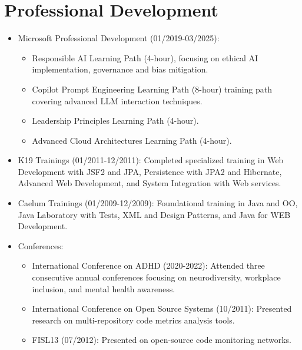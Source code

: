 
\section{Professional Development}
\begin{itemize}
    \item \footnotesize{Microsoft Professional Development (01/2019-03/2025):}
    \begin{itemize}
        \item \scriptsize{Responsible AI Learning Path (4-hour), focusing on ethical AI implementation, governance and bias mitigation.}
        \item \scriptsize{Copilot Prompt Engineering Learning Path (8-hour) training path covering advanced LLM interaction techniques.}
        \item \scriptsize{Leadership Principles Learning Path (4-hour).}
        \item \scriptsize{Advanced Cloud Architectures Learning Path (4-hour).}
    \end{itemize}
    \item \footnotesize{K19 Trainings (01/2011-12/2011):}\scriptsize{ Completed specialized training in Web Development with JSF2 and JPA, Persistence with JPA2 and Hibernate, Advanced Web Development, and System Integration with Web services.}
    \item \footnotesize{Caelum Trainings (01/2009-12/2009):}\scriptsize{ Foundational training in Java and OO, Java Laboratory with Tests, XML and Design Patterns, and Java for WEB Development.}
    \item \footnotesize{Conferences:}
    \begin{itemize}
        \item \scriptsize{International Conference on ADHD (2020-2022): Attended three consecutive 
            annual conferences focusing on neurodiversity, workplace inclusion, and mental health
            awareness.}
        \item \scriptsize{International Conference on Open Source Systems (10/2011): Presented research
            on multi-repository code metrics analysis tools.}
        \item \scriptsize{FISL13 (07/2012): Presented on open-source code monitoring networks.}
    \end{itemize}
\end{itemize}